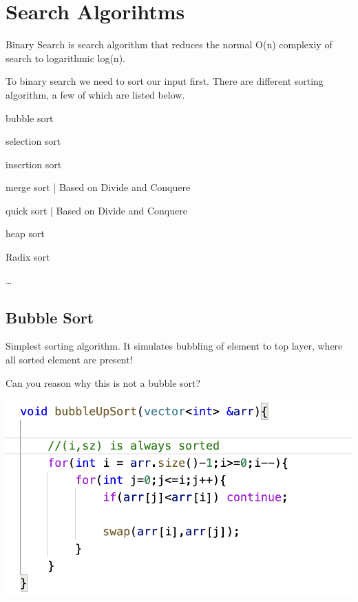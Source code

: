 \chapter{Search Algorihtms}{\label{ch:binary_search}}

Binary Search is search algorithm that reduces the normal O(n) complexiy of search to logarithmic log(n).

To binary search we need to sort our input first. There are different sorting algorithm, a few of which are listed below.
\begin{compactenum}
     \item bubble sort
     \item selection sort
     \item insertion sort
    
    \item merge sort | Based on Divide and Conquere
    \item quick sort | Based on Divide and Conquere
    \item heap sort
    \item 
    \item Radix sort
    \item \dots
\end{compactenum}

\section{Bubble Sort}
Simplest sorting algorithm.
It simulates bubbling of element to top layer, where all sorted element are present!
\begin{marginfigure}
     
\caption{Can you reason why this is not a bubble sort?}
     \includegraphics[width=\marginparwidth]{resources/sorting-not-bubble-sort.png}
 \end{marginfigure}

